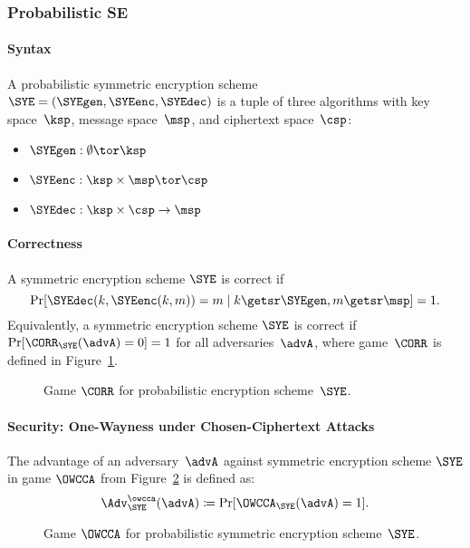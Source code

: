 \documentclass[a4paper,orivec]{llncs}
\begin{document}
\subsubsection{Probabilistic SE}

\paragraph{Syntax}
A probabilistic symmetric encryption scheme $\SYE=(\SYEgen,\SYEenc,\SYEdec)$ is a tuple of three algorithms with key space~$\ksp$, message space~$\msp$, and ciphertext space~$\csp$:

\begin{itemize}
    \item $\SYEgen: \emptyset \tor \ksp$
    \item $\SYEenc: \ksp\times\msp \tor \csp$
    \item $\SYEdec: \ksp\times\csp \to \msp$
\end{itemize}

\paragraph{Correctness}
A symmetric encryption scheme $\SYE$ is correct if 
\[
\Pr[\SYEdec(k,\SYEenc(k,m))=m\mid k\getsr\SYEgen,m\getsr\msp]=1\text{.}
\]
Equivalently, a symmetric encryption scheme $\SYE$ is correct if $\Pr[\CORR_{\SYE}(\advA)=0]=1$ for all adversaries~$\advA$, where game~$\CORR$ is defined in Figure~\ref{fig:sym:enc:corr:prob}.

\begin{figure}[!ht]
    \centering
    \nicoresetlinenr%
    \fbox{%
        \scalebox{\codescalefactor}{%
        }%
    }
    \caption{%
        Game $\CORR$ for probabilistic encryption scheme~$\SYE$.
    }
    \label{fig:sym:enc:corr:prob}
\end{figure}

\paragraph{Security: One-Wayness under Chosen-Ciphertext Attacks}
The advantage of an adversary~$\advA$ against symmetric encryption scheme $\SYE$ in game $\OWCCA$ from Figure~\ref{fig:sym:enc:ow:prob} is defined as:
\[
\Adv_\SYE^\owcca(\advA)\coloneqq\Pr[\OWCCA_{\SYE}(\advA)=1]\text{.}
\]

\begin{figure}[!ht]
    \centering
    \nicoresetlinenr%
    \fbox{%
        \scalebox{\codescalefactor}{%
        }%
    }
    \caption{%
        Game $\OWCCA$ for probabilistic symmetric encryption scheme~$\SYE$.
    }
    \label{fig:sym:enc:ow:prob}
\end{figure}
\end{document}
